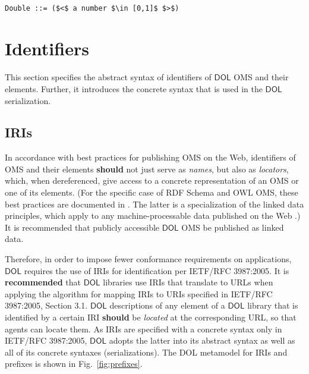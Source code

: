 \documentclass[10pt,fleqn,final]{scrreprt}
\makeatletter
\newcommand*\CommentAuthor{}
\renewcommand*\CommentAuthor{#1}}
\newcommand*\CommentDate{}
\renewcommand*\CommentDate{#1}}
\newcommand*\CommentId{}
\renewcommand*\CommentId{#1}}
\newcommand*\CommentType{}
\renewcommand*\CommentType{#1}}
\newcommand*{\SetCommentColorByType}[1]{%
\edef\localType{{#1}}%
\expandafter\ifstrequal\localType{q-aut}{\colorlet{CommentColor}{red}}{%
\expandafter\ifstrequal\localType{q-all}{\colorlet{CommentColor}{orange}}{%
\expandafter\ifstrequal\localType{todo}{\colorlet{CommentColor}{orange}}{%
\expandafter\ifstrequal\localType{fyi}{\colorlet{CommentColor}{lightgray}}{%
\colorlet{CommentColor}{yellow}}}}}}
\newcommand*{\SetCommentPrefixByType}[1]{%
\edef\localType{{#1}}%
\expandafter\@ifmtarg\localType{%
\edef\CommentPrefix{}%
}{%
\caseupper[q]{#1}%
\edef\CommentPrefix{\thestring: }%
}}
\newcommand*{\initComment}[1]{%
\setkeys{Comment}{#1}%
\SetCommentColorByType{\CommentType}%
\relax%
\SetCommentPrefixByType{\CommentType}%
\relax%
}
\newcommand*{\todonote}[2][]{%
\initComment{#1}%
\pdfcomment[author=\CommentAuthor,color=CommentColor,date=\CommentDate,id=\CommentId]{%
\CommentPrefix
#2}}
\renewcommand*{\todonote}[2][]{%
\initComment{#1}%
\ednote{\CommentPrefix #2}}
\newcommand*{\CLnote}[2][author=Christoph Lange]{%
\todonote[author=Christoph Lange,#1]{#2} 
}
\newcommand*{\recommended}{\textbf{recommended}\xspace}
\newcommand*{\should}{\textbf{should}\xspace}
\newcommand*{\DOL}{\ensuremath{\mathsf{DOL}}\xspace}
\newcommand{\sclause}[1]{\section{#1}}
\newcommand{\ssclause}[1]{\subsection{#1}}
\newcommand{\nisref}[1]{#1}
\newenvironment{definitions}[0]{\medskip }{}
\makeatother
\begin{document}
\begin{definitions}
\begin{lstlisting}[language=ebnf,escapeinside={()}]

Double ::= ($<$ a number $\in [0,1]$ $>$) 
\end{lstlisting}






\sclause{Identifiers}\label{c:identifiers}
This section specifies the abstract syntax of identifiers of \DOL OMS and their elements. Further, 
it introduces the concrete syntax that is used in the \DOL serialization. 
\ssclause{IRIs}\label{c:iris}


In accordance with best practices for publishing OMS on the Web, identifiers of OMS and their 
elements \should not just serve as \emph{names}, but also as \emph{locators}, which, when 
dereferenced, give access to a concrete representation of an OMS or one of its elements.  (For the 
specific case of RDF Schema and OWL OMS, these best practices are documented in 
\cite{W3C:NOTE-swbp-vocab-pub-20080828}.  The latter is a specialization of the linked data 
principles, which apply to any machine-processable data published on the Web 
\cite{BernersLee:LinkedData2006}.)  It is recommended that publicly accessible \DOL OMS be published 
as linked data.

Therefore, in order to impose fewer conformance requirements on applications, \DOL requires the use of
 IRIs for identification per \nisref{IETF/RFC 3987:2005}.
  It is \recommended that \DOL libraries use 
IRIs that translate to URLs when applying the algorithm for mapping IRIs to URIs specified in 
\nisref{IETF/RFC 3987:2005, Section 3.1}.  \DOL descriptions of any element of a \DOL library that is 
identified by a certain IRI \should be \emph{located} at the corresponding URL, so that agents can 
locate them.  As IRIs are specified with a concrete syntax only in \nisref{IETF/RFC 3987:2005}, \DOL 
adopts the latter into its abstract syntax as well as all of its concrete syntaxes 
(serializations).
The DOL metamodel for IRIs and prefixes is shown in Fig.~\ref{fig:prefixes}.



\end{definitions}
\end{document}
